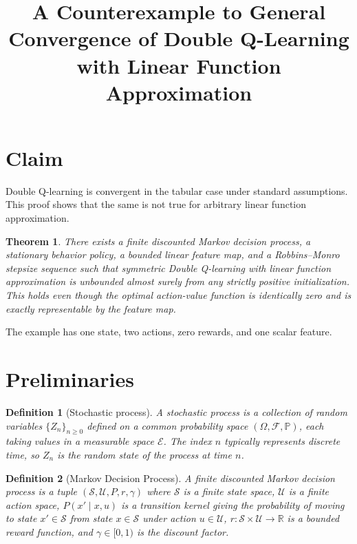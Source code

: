 \documentclass[11pt]{article}
\title{A Counterexample to General Convergence of Double Q-Learning with Linear Function Approximation}
\author{}
\date{}
\newtheorem{theorem}{Theorem}
\newtheorem{definition}{Definition}
\begin{document}
\maketitle

\section{Claim}

Double Q-learning is convergent in the tabular case under standard assumptions. This proof shows that the same is not true for arbitrary linear function approximation.

\begin{theorem}
There exists a finite discounted Markov decision process, a stationary behavior policy, a bounded linear feature map, and a Robbins--Monro stepsize sequence such that symmetric Double Q-learning with linear function approximation is unbounded almost surely from any strictly positive initialization. This holds even though the optimal action-value function is identically zero and is exactly representable by the feature map.
\end{theorem}

The example has one state, two actions, zero rewards, and one scalar feature.

\section{Preliminaries}

\begin{definition}[Stochastic process]
A \textit{stochastic process} is a collection of random variables $\{Z_n\}_{n \geq 0}$ defined on a common probability space $(\Omega, \mathcal{F}, \mathbb{P})$, each taking values in a measurable space $\mathcal{E}$. The index $n$ typically represents discrete time, so $Z_n$ is the random state of the process at time $n$.
\end{definition}

\begin{definition}[Markov Decision Process]
A \textit{finite discounted Markov decision process} is a tuple $(\mathcal{S}, \mathcal{U}, P, r, \gamma)$ where $\mathcal{S}$ is a finite state space, $\mathcal{U}$ is a finite action space, $P(x' \mid x, u)$ is a transition kernel giving the probability of moving to state $x' \in \mathcal{S}$ from state $x \in \mathcal{S}$ under action $u \in \mathcal{U}$, $r \colon \mathcal{S} \times \mathcal{U} \to \mathbb{R}$ is a bounded reward function, and $\gamma \in [0,1)$ is the discount factor.
\end{definition}
\end{document}
